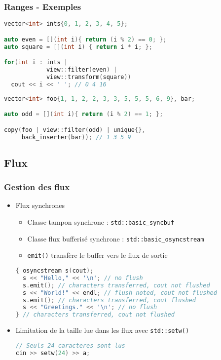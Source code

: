 \documentclass[C++.tex]{subfiles}
\begin{document}
\begin{frame}[fragile]
	\frametitle{Ranges - Exemples}
	\begin{lstlisting}[language=C++]
vector<int> ints{0, 1, 2, 3, 4, 5};

auto even = [](int i){ return (i % 2) == 0; };
auto square = [](int i) { return i * i; };

for(int i : ints | 
            view::filter(even) | 
            view::transform(square))
  cout << i << ' '; // 0 4 16\end{lstlisting}

	\begin{lstlisting}[language=C++]
vector<int> foo{1, 1, 2, 2, 3, 3, 5, 5, 5, 6, 9}, bar;

auto odd = [](int i){ return (i % 2) == 1; };

copy(foo | view::filter(odd) | unique{}, 
     back_inserter(bar)); // 1 3 5 9\end{lstlisting}
\end{frame}

\subsection*{Flux}
\begin{frame}[fragile]
	\frametitle{Gestion des flux}
	\begin{itemize}
		\item Flux synchrones
		\begin{itemize}
			\item Classe tampon synchrone : \lstinline|std::basic_syncbuf|
			\item Classe flux bufferisé synchrone : \lstinline|std::basic_osyncstream|
			\item \lstinline|emit()| transfère le buffer vers le flux de sortie
		\end{itemize}


		\begin{lstlisting}[language=C++]
{ osyncstream s(cout);
  s << "Hello," << '\n'; // no flush
  s.emit(); // characters transferred, cout not flushed
  s << "World!" << endl; // flush noted, cout not flushed
  s.emit(); // characters transferred, cout flushed
  s << "Greetings." << '\n'; // no flush
} // characters transferred, cout not flushed\end{lstlisting}

		\item Limitation de la taille lue dans les flux avec \lstinline|std::setw()|

		\begin{lstlisting}[language=C++]
// Seuls 24 caracteres sont lus
cin >> setw(24) >> a;\end{lstlisting}
	\end{itemize}
\end{frame}
\end{document}
